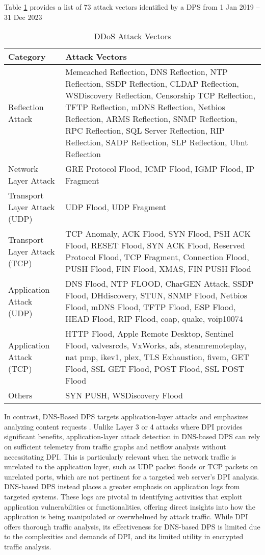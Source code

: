 Table \ref{tab:ddos_attack_vectors} provides a list of 73 attack vectors identified by a DPS from 1 Jan 2019 – 31 Dec 2023


\begin{table}[!htbp]
\caption{DDoS Attack Vectors}
\label{tab:ddos_attack_vectors}
\centering
\begin{tabular}{|>{\raggedright\arraybackslash}p{2.7cm}|>{\raggedright\arraybackslash}p{4.8cm}|}
\hline
\textbf{Category} & \textbf{Attack Vectors} \\
\hline
Reflection Attack & Memcached Reflection, DNS Reflection, NTP Reflection, SSDP Reflection, CLDAP Reflection, WSDiscovery Reflection, Censorship TCP Reflection, TFTP Reflection, mDNS Reflection, Netbios Reflection, ARMS Reflection, SNMP Reflection, RPC Reflection, SQL Server Reflection, RIP Reflection, SADP Reflection, SLP Reflection, Ubnt Reflection \\
\hline
Network Layer Attack & GRE Protocol Flood, ICMP Flood, IGMP Flood, IP Fragment \\
\hline
Transport Layer Attack (UDP) & UDP Flood, UDP Fragment \\
\hline
Transport Layer Attack (TCP) & TCP Anomaly, ACK Flood, SYN Flood, PSH ACK Flood, RESET Flood, SYN ACK Flood, Reserved Protocol Flood, TCP Fragment, Connection Flood, PUSH Flood, FIN Flood, XMAS, FIN PUSH Flood \\
\hline
Application Attack (UDP) & DNS Flood, NTP FLOOD, CharGEN Attack, SSDP Flood, DHdiscovery, STUN, SNMP Flood, Netbios Flood, mDNS Flood, TFTP Flood, ESP Flood, HEAD Flood, RIP Flood, coap, quake, voip10074 \\
\hline
Application Attack (TCP) & HTTP Flood, Apple Remote Desktop, Sentinel Flood, valvesrcds, VxWorks, afs, steamremoteplay, nat pmp, ikev1, plex, TLS Exhaustion, fivem, GET Flood, SSL GET Flood, POST Flood, SSL POST Flood \\
\hline
Others & SYN PUSH, WSDiscovery Flood \\
\hline
\end{tabular}
\end{table}



In contrast, DNS-Based DPS targets application-layer attacks and emphasizes analyzing content requests \cite{xie2008monitoring}. Unlike Layer 3 or 4 attacks where DPI provides significant benefits, application-layer attack detection in DNS-based DPS can rely on sufficient telemetry from traffic graphs and netflow analysis without necessitating DPI. This is particularly relevant when the network traffic is unrelated to the application layer, such as UDP packet floods or TCP packets on unrelated ports, which are not pertinent for a targeted web server's DPI analysis. DNS-based DPS instead places a greater emphasis on application logs from targeted systems. These logs are pivotal in identifying activities that exploit application vulnerabilities or functionalities, offering direct insights into how the application is being manipulated or overwhelmed by attack traffic. While DPI offers thorough traffic analysis, its effectiveness for DNS-based DPS is limited due to the complexities and demands of DPI, and its limited utility in encrypted traffic analysis.

